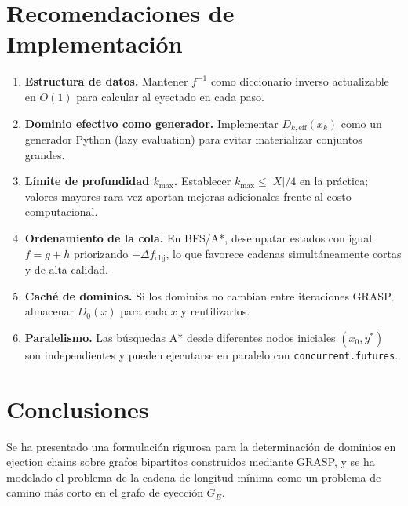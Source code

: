 \documentclass[12pt, a4paper]{article}
\theoremstyle{definition}
\theoremstyle{plain}
\theoremstyle{remark}
\newcommand{\GE}{G_{\!E}}
\newcommand{\domk}[2]{D_{#1}\!\left(#2\right)}
\begin{document}
\section{Recomendaciones de Implementación}

\begin{enumerate}
  \item \textbf{Estructura de datos.}  Mantener $f^{-1}$ como diccionario
        inverso actualizable en $O(1)$ para calcular al eyectado en cada paso.

  \item \textbf{Dominio efectivo como generador.}  Implementar
        $\domk{k,\text{eff}}{x_k}$ como un generador Python (lazy evaluation)
        para evitar materializar conjuntos grandes.

  \item \textbf{Límite de profundidad $k_{\max}$.}  Establecer $k_{\max} \leq
        |X|/4$ en la práctica; valores mayores rara vez aportan mejoras
        adicionales frente al costo computacional.

  \item \textbf{Ordenamiento de la cola.}  En BFS/A*, desempatar estados con
        igual $f = g + h$ priorizando $-\Delta f_{\text{obj}}$, lo que favorece
        cadenas simultáneamente cortas y de alta calidad.

  \item \textbf{Caché de dominios.}  Si los dominios no cambian entre
        iteraciones GRASP, almacenar $\domk{0}{x}$ para cada $x$ y
        reutilizarlos.

  \item \textbf{Paralelismo.}  Las búsquedas A* desde diferentes nodos
        iniciales $(x_0, y^*)$ son independientes y pueden ejecutarse en
        paralelo con \texttt{concurrent.futures}.
\end{enumerate}

\section{Conclusiones}

Se ha presentado una formulación rigurosa para la determinación de dominios en
ejection chains sobre grafos bipartitos construidos mediante GRASP, y se ha
modelado el problema de la cadena de longitud mínima como un problema de camino
más corto en el grafo de eyección $\GE$.
\end{document}
